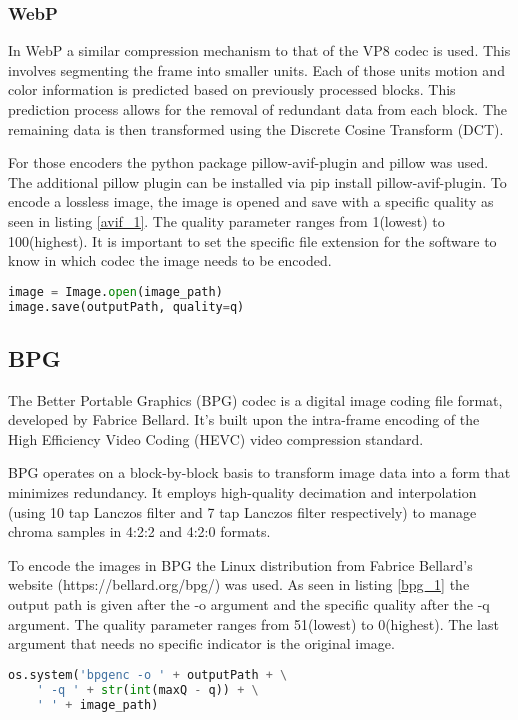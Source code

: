 \subsubsection{WebP}
In WebP a similar compression mechanism to that of the VP8 codec is used. This involves segmenting the frame into smaller units. Each of those units motion and color information is predicted based on previously processed blocks. This prediction process allows for the removal of redundant data from each block. The remaining data is then transformed using the Discrete Cosine Transform (DCT).

For those encoders the python package pillow-avif-plugin and pillow was used. The additional pillow plugin can be installed via pip install pillow-avif-plugin. To encode a lossless image, the image is opened and save with a specific quality as seen in listing \ref{avif_1}. The quality parameter ranges from 1(lowest) to 100(highest). It is important to set the specific file extension for the software to
know in which codec the image needs to be encoded.
\begin{lstlisting}[label={avif_1}, language=Python, caption=Encode AVIF\, JPEG and WebP]
image = Image.open(image_path)
image.save(outputPath, quality=q)
\end{lstlisting}

\subsection{BPG}
The Better Portable Graphics (BPG) codec is a digital image coding file format, developed by Fabrice Bellard. It’s built upon the intra-frame encoding of the High Efficiency Video Coding (HEVC) video compression standard.

BPG operates on a block-by-block basis to transform image data into a form that minimizes redundancy. It employs high-quality decimation and interpolation (using 10 tap Lanczos filter and 7 tap Lanczos filter respectively) to manage chroma samples in 4:2:2 and 4:2:0 formats.

To encode the images in BPG the Linux distribution from Fabrice Bellard's website (https://bellard.org/bpg/) was used. As seen in listing \ref{bpg_1} the output path is given after the -o argument and the specific quality after the -q argument. The quality parameter ranges from 51(lowest) to 0(highest). The last argument that needs no specific indicator is the original image.

\begin{lstlisting}[label={bpg_1}, language=Python, caption=Encode BPG]
os.system('bpgenc -o ' + outputPath + \
    ' -q ' + str(int(maxQ - q)) + \
    ' ' + image_path)
\end{lstlisting}


